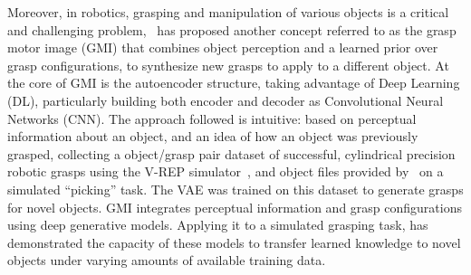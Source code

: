 Moreover, in robotics, grasping and manipulation of various objects is a critical and challenging problem,~\cite{veres2017modeling} has proposed another concept referred to as the grasp motor image (GMI) that combines
object perception and a learned prior over grasp configurations, to synthesize new grasps to apply to a different object. At the core of GMI is the autoencoder structure, taking advantage of Deep  Learning (DL), particularly building both encoder and decoder as Convolutional Neural Networks (CNN). The approach followed is intuitive: based on
perceptual information about an object, and an idea of how an object was previously grasped, collecting a object/grasp pair dataset of successful, cylindrical precision
robotic grasps using the V-REP simulator~\cite{rohmer2013v}, and object files provided by~\cite{kleinhans2015g3db} on a simulated “picking” task. The VAE was trained on this dataset to generate grasps for novel objects. GMI integrates
perceptual information and grasp configurations using deep generative models. Applying it to a simulated grasping task, has demonstrated the capacity of these models to transfer learned knowledge to novel objects under varying
amounts of available training data.\\





\clearpage{\pagestyle{empty}\cleardoublepage}